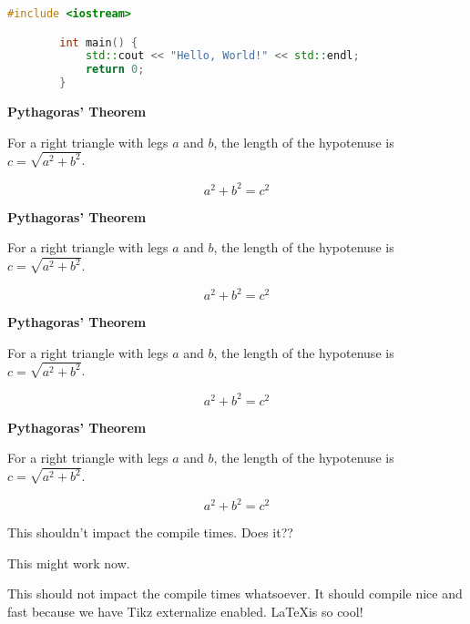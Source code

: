 \begin{lstlisting}[language=C++]
        #include <iostream>

        int main() {
            std::cout << "Hello, World!" << std::endl;
            return 0;
        }
\end{lstlisting}

\begin{theorem}
    \textbf{Pythagoras' Theorem}

    For a right triangle with legs $a$ and $b$, the length of the hypotenuse is
    $c = \sqrt{a^2 + b^2}$.

    \begin{equation*}
        a^2 + b^2 = c^2
    \end{equation*}
\end{theorem}

\begin{lemma}
    \textbf{Pythagoras' Theorem}

    For a right triangle with legs $a$ and $b$, the length of the hypotenuse is
    $c = \sqrt{a^2 + b^2}$.

    \begin{equation*}
        a^2 + b^2 = c^2
    \end{equation*}
\end{lemma}

\begin{corollary}
    \textbf{Pythagoras' Theorem}

    For a right triangle with legs $a$ and $b$, the length of the hypotenuse is
    $c = \sqrt{a^2 + b^2}$.

    \begin{equation*}
        a^2 + b^2 = c^2
    \end{equation*}
\end{corollary}

\begin{proposition}
    \textbf{Pythagoras' Theorem}

    For a right triangle with legs $a$ and $b$, the length of the hypotenuse is
    $c = \sqrt{a^2 + b^2}$.

    \begin{equation*}
        a^2 + b^2 = c^2
    \end{equation*}
\end{proposition}

This shouldn't impact the compile times. Does it??

This might work now.

This should not impact the compile times whatsoever. It should compile nice and
fast because we have Tikz externalize enabled. \LaTeX is so cool!
